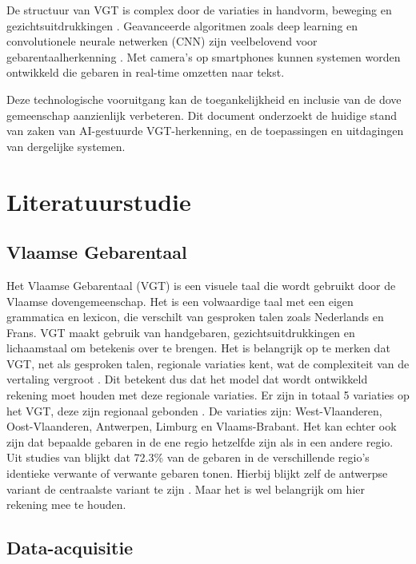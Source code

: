 De structuur van VGT is complex door de variaties in handvorm, beweging en gezichtsuitdrukkingen \autocite{469340}. Geavanceerde algoritmen zoals deep learning en convolutionele neurale netwerken (CNN) zijn veelbelovend voor gebarentaalherkenning \autocite{10.52756/ijerr.2023.v34spl.004}\autocite{10.17485/ijst/v16i45.2583}. Met camera's op smartphones kunnen systemen worden ontwikkeld die gebaren in real-time omzetten naar tekst.

Deze technologische vooruitgang kan de toegankelijkheid en inclusie van de dove gemeenschap aanzienlijk verbeteren. Dit document onderzoekt de huidige stand van zaken van AI-gestuurde VGT-herkenning, en de toepassingen en uitdagingen van dergelijke systemen.
\section{Literatuurstudie}%
\label{sec:literatuurstudie}

\subsection{Vlaamse Gebarentaal}
\label{subsec:vgt}

Het Vlaamse Gebarentaal (VGT) is een visuele taal die wordt gebruikt door de Vlaamse dovengemeenschap. 
Het is een volwaardige taal met een eigen grammatica en lexicon, die verschilt van gesproken talen zoals Nederlands en Frans. 
VGT maakt gebruik van handgebaren, gezichtsuitdrukkingen en lichaamstaal om betekenis over te brengen. 
Het is belangrijk op te merken dat VGT, net als gesproken talen, regionale variaties kent, wat de complexiteit van de vertaling vergroot \autocite{469340}.
Dit betekent dus dat het model dat wordt ontwikkeld rekening moet houden met deze regionale variaties.
Er zijn in totaal 5 variaties op het VGT, deze zijn regionaal gebonden \autocite{469340}.
De variaties zijn: West-Vlaanderen, Oost-Vlaanderen, Antwerpen, Limburg en Vlaams-Brabant.
Het kan echter ook zijn dat bepaalde gebaren in de ene regio hetzelfde zijn als in een andere regio.
Uit studies van \textcite{469340} blijkt dat 72.3\% van de gebaren in de verschillende regio's identieke verwante of verwante gebaren tonen.
Hierbij blijkt zelf de antwerpse variant de centraalste variant te zijn \autocite{469340}.
Maar het is wel belangrijk om hier rekening mee te houden.


\subsection{Data-acquisitie}
\label{subsec:data-acquisitie}


